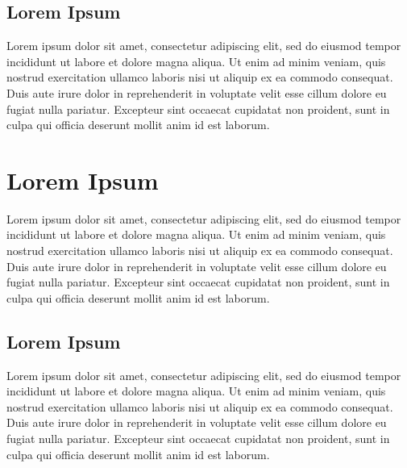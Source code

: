 \documentclass[a4paper, dvipdfmx, 11pt]{jsarticle}
\theoremstyle{definition}
\begin{document}
  \subsection{Lorem Ipsum}
  Lorem ipsum dolor sit amet, consectetur adipiscing elit, sed do eiusmod tempor incididunt ut labore et dolore magna aliqua.
  Ut enim ad minim veniam, quis nostrud exercitation ullamco laboris nisi ut aliquip ex ea commodo consequat.
  Duis aute irure dolor in reprehenderit in voluptate velit esse cillum dolore eu fugiat nulla pariatur.
  Excepteur sint occaecat cupidatat non proident, sunt in culpa qui officia deserunt mollit anim id est laborum.

  \section{Lorem Ipsum}
  Lorem ipsum dolor sit amet, consectetur adipiscing elit, sed do eiusmod tempor incididunt ut labore et dolore magna aliqua.
  Ut enim ad minim veniam, quis nostrud exercitation ullamco laboris nisi ut aliquip ex ea commodo consequat.
  Duis aute irure dolor in reprehenderit in voluptate velit esse cillum dolore eu fugiat nulla pariatur.
  Excepteur sint occaecat cupidatat non proident, sunt in culpa qui officia deserunt mollit anim id est laborum.

  \subsection{Lorem Ipsum}
  Lorem ipsum dolor sit amet, consectetur adipiscing elit, sed do eiusmod tempor incididunt ut labore et dolore magna aliqua.
  Ut enim ad minim veniam, quis nostrud exercitation ullamco laboris nisi ut aliquip ex ea commodo consequat.
  Duis aute irure dolor in reprehenderit in voluptate velit esse cillum dolore eu fugiat nulla pariatur.
  Excepteur sint occaecat cupidatat non proident, sunt in culpa qui officia deserunt mollit anim id est laborum.

  
\end{document}
